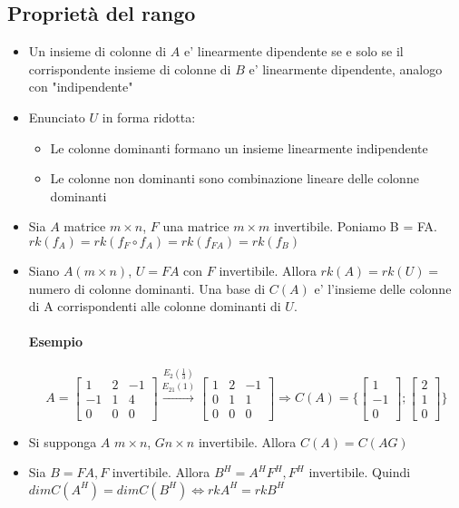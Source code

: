 \documentclass[a4paper, 10pt]{article}
\begin{document}
	\subsection*{Proprietà del rango}
	\begin{itemize}
	
	
	\item Un insieme di colonne di $A$ e' linearmente dipendente se e solo se 
						  il corrispondente insieme di colonne di $B$ e' linearmente dipendente, 
						  analogo con "indipendente"
	\item{Enunciato} $U$ in forma ridotta:
		\begin{itemize}
			\item Le colonne dominanti formano un insieme linearmente indipendente 
			\item Le colonne non dominanti sono combinazione lineare delle colonne dominanti
		\end{itemize}
	
	
	\item Sia $A$ matrice $m \times n$, $F$ una matrice $m \times m$ invertibile. 
						  Poniamo B = FA. $rk(f_A) = rk(f_F \circ f_A) = rk(f_{FA}) = rk(f_B)$
	
	\item Siano $A (m \times n)$, $U = FA$ con $F$ invertibile. Allora $rk(A) = rk(U) =$ numero di colonne dominanti.
	Una base di $C(A)$ e' l'insieme delle colonne di A corrispondenti alle colonne dominanti di $U$.
	
	\paragraph{Esempio} \[ A = \begin{bmatrix} 1 & 2 & -1 \\ -1 & 1 & 4 \\ 0 & 0 & 0 \end{bmatrix} \stackrel{E_2(\frac{1}{3})}
						{\stackrel{E_{21}(1)}{\longrightarrow}} \begin{bmatrix}
							1 & 2 & -1 \\ 0 & 1 & 1 \\ 0 & 0 & 0  \end{bmatrix} \Rightarrow C(A) = \lbrace 
							\begin{bmatrix} 1 \\ -1 \\ 0 \end{bmatrix} ; \begin{bmatrix} 2 \\ 1 \\ 0 	\end{bmatrix} \rbrace
						\]
	\item Si supponga $A$ $m \times n$, $G n \times n$ invertibile. Allora $C(A) = C(AG)$
	\item Sia $B = FA, F$ invertibile. Allora $B^H = A^H F^H, F^H$ invertibile. 
		  Quindi $dimC(A^H) = dimC(B^H) \Leftrightarrow rkA^H = rkB^H$


\end{itemize}
\end{document}
